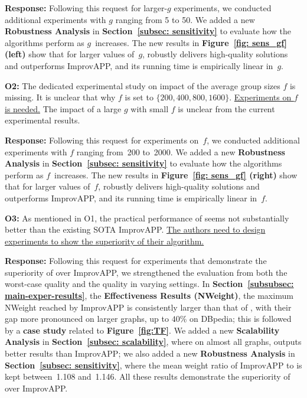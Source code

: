 \textbf{Response:} Following this request for larger-$g$ experiments, we conducted additional experiments with $g$ ranging from 5 to 50. We added a new \textbf{Robustness Analysis} in \textbf{Section~\ref{subsec: sensitivity}} to evaluate how the algorithms perform as $g$~increases. The new results in \textbf{Figure~\ref{fig: sens_gf} (left)} show that for larger values of~$g$, \ImprovPTS robustly delivers high-quality solutions and outperforms ImprovAPP, and its running time is empirically linear in~$g$.

\textbf{O2:} The dedicated experimental study on impact of the average group sizes $f$ is missing. It is unclear that why $f$ is set to $\{200, 400, 800, 1600\}$. \uline{Experiments on $f$ is needed.} The impact of a large $g$ with small $f$ is unclear from the current experimental results.

\textbf{Response:} Following this request for experiments on~$f$, we conducted additional experiments with $f$ ranging from~200 to~2000. We added a new \textbf{Robustness Analysis} in \textbf{Section~\ref{subsec: sensitivity}} to evaluate how the algorithms perform as $f$~increases. The new results in \textbf{Figure~\ref{fig: sens_gf} (right)} show that for larger values of~$f$, \ImprovPTS robustly delivers high-quality solutions and outperforms ImprovAPP, and its running time is empirically linear in~$f$.

\textbf{O3:} As mentioned in O1, the practical performance of \Improved seems not substantially better than the existing SOTA ImprovAPP. \uline{The authors need to design experiments to show the superiority of their algorithm.}

\textbf{Response:} Following this request for experiments that demonstrate the superiority of \ImprovPTS over ImprovAPP, we strengthened the evaluation from both the worst-case quality and the quality in varying settings. In \textbf{Section~\ref{subsubsec: main-exper-results}}, the \textbf{Effectiveness Results (NWeight)}, the maximum NWeight reached by ImprovAPP is consistently larger than that of \ImprovPTS, with their gap more pronounced on larger graphs, up to $40\%$ on DBpedia; this is followed by a \textbf{case study} related to \textbf{Figure~\ref{fig:TF}}. We added a new \textbf{Scalability Analysis} in \textbf{Section~\ref{subsec: scalability}}, where on almost all graphs, \Improved outputs better results than ImprovAPP; we also added a new \textbf{Robustness Analysis} in \textbf{Section~\ref{subsec: sensitivity}}, where the mean weight ratio of ImprovAPP to \ImprovPTS is kept between~1.108 and~1.146. All these results demonstrate the superiority of \ImprovPTS over ImprovAPP.

